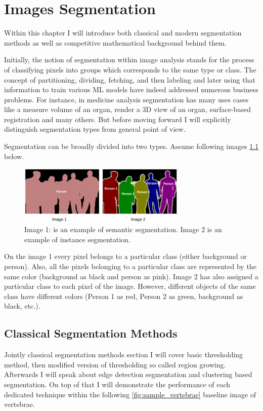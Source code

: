 \chapter{Images Segmentation}
\label{ch:image_segmentation}
Within this chapter I will introduce both classical and modern segmentation methods as well as competitive mathematical background behind them.

Initially, the notion of segmentation within image analysis stands for the process of classifying pixels into groups which corresponds to the same type or class. The concept of partitioning, dividing, fetching, and then labeling and later using that information to train various ML models have indeed addressed numerous business problems. For instance, in medicine analysis segmentation has many uses cases like a measure volume of an organ, render a 3D view of an organ, surface-based registration and many others. But before moving forward I will explicitly distinguish segmentation types from general point of view.

Segmentation can be broadly divided into two types. Assume following images \ref{fig:image_segmentation} below. 
\begin{figure}[h]
    \centering
    \includegraphics[width=8cm]{images/segmentation_types.png}
    \caption{Image 1: is an example of semantic segmentation. Image 2 is an example of instance segmentation.}
    \label{fig:image_segmentation}
\end{figure}

On the image 1 every pixel belongs to a particular class (either background or person). Also, all the pixels belonging to a particular class are represented by the same color (background as black and person as pink). Image 2 has also assigned a particular class to each pixel of the image. However, different objects of the same class have different colors (Person 1 as red, Person 2 as green, background as black, etc.).

\section{Classical Segmentation Methods} 
Jointly classical segmentation methods section I will cover basic thresholding method, then modified version of thresholding so called region growing. Afterwards I will speak about edge detection segmentation and clustering based segmentation. 
On top of that I will demonstrate the performance of each dedicated technique within the following \ref{fig:sample_vertebrae} baseline image of vertebrae.

